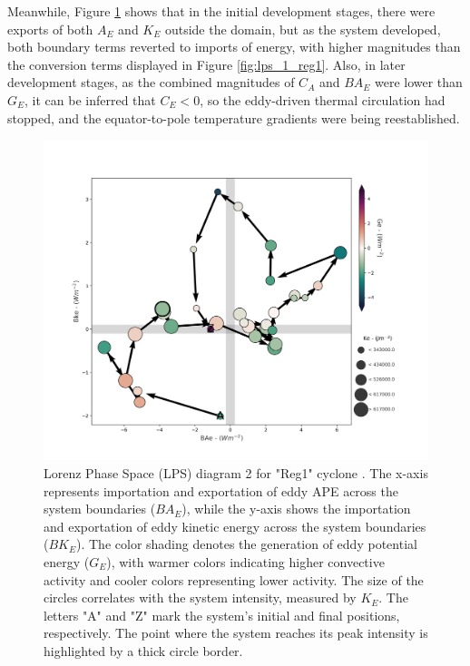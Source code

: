 Meanwhile, Figure \ref{fig:lps_2_reg1} shows that in the initial development stages, there were exports of both $A_E$ and $K_E$ outside the domain, but as the system developed, both boundary terms reverted to imports of energy, with higher magnitudes than the conversion terms displayed in Figure \ref{fig:lps_1_reg1}. Also, in later development stages, as the combined magnitudes of $C_A$ and $BA_E$ were lower than $G_E$, it can be inferred that $C_E < 0$, so the eddy-driven thermal circulation had stopped, and the equator-to-pole temperature gradients were being reestablished.


\begin{figure}[!htbp]
\centering
\includegraphics[width=\textwidth]{figs_6/lps-import_Reg1-Representative_NCEP-R2_fixed.png}
\caption[LPS 2 - "Reg1" Cyclone]{Lorenz Phase Space (LPS) diagram 2 for "Reg1" cyclone \citep{dias2011energy}. The x-axis represents importation and exportation of eddy APE across the system boundaries ($BA_E$), while the y-axis shows the importation and exportation of eddy kinetic energy across the system boundaries ($BK_E$). The color shading denotes the generation of eddy potential energy ($G_E$), with warmer colors indicating higher convective activity and cooler colors representing lower activity. The size of the circles correlates with the system intensity, measured by $K_E$. The letters "A" and "Z" mark the system's initial and final positions, respectively. The point where the system reaches its peak intensity is highlighted by a thick circle border.}
\label{fig:lps_2_reg1}
\end{figure}


